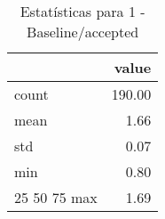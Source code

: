 \begin{table}[htbp]
\caption{Estatísticas para 1 - Baseline/accepted}
\label{tab:1_-_baseline_accepted_summary}
\begin{tabular}{lr}
\toprule
 & value \\
\midrule
count & 190.00 \\
mean & 1.66 \\
std & 0.07 \\
min & 0.80 \\
25%
50%
75%
max & 1.69 \\
\bottomrule
\end{tabular}
\end{table}
